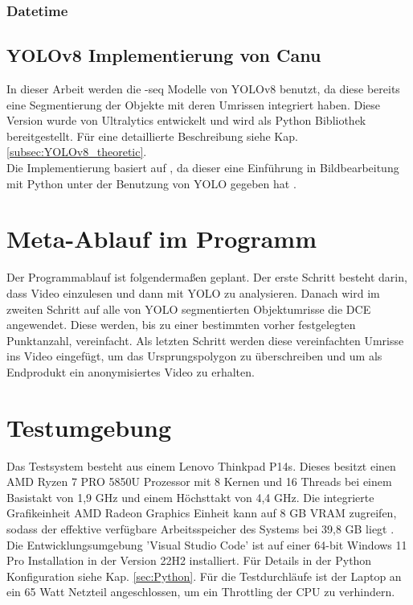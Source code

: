 		\subsubsection{Datetime}{
		}
		\subsection{YOLOv8 Implementierung von Canu}
		{ \label{YOLOv8_canu}
		In dieser Arbeit werden die \glqq-seq\grqq{} Modelle von YOLOv8 benutzt, da diese bereits eine Segmentierung der Objekte mit deren Umrissen integriert haben. Diese Version wurde von Ultralytics entwickelt und wird als Python Bibliothek bereitgestellt. Für eine detaillierte Beschreibung siehe Kap. \ref{subsec:YOLOv8_theoretic}. \\
		Die Implementierung basiert auf \citeauthor{Canu_pysource}, da dieser eine Einführung in Bildbearbeitung mit Python unter der Benutzung von YOLO gegeben hat \citep{Canu_pysource}.
		}


	
	\section{Meta-Ablauf im Programm}{
	Der Programmablauf ist folgendermaßen geplant. Der erste Schritt besteht darin, dass Video einzulesen und dann mit YOLO zu analysieren. Danach wird im zweiten Schritt auf alle von YOLO segmentierten Objektumrisse die DCE angewendet. Diese werden, bis zu einer bestimmten vorher festgelegten Punktanzahl, vereinfacht. Als letzten Schritt werden diese vereinfachten Umrisse ins Video eingefügt, um das Ursprungspolygon zu überschreiben und um als Endprodukt ein anonymisiertes Video zu erhalten.

	\section{Testumgebung}{ \label{sec:testumgebung}
	Das Testsystem besteht aus einem Lenovo Thinkpad P14s. Dieses besitzt einen AMD Ryzen 7 PRO 5850U Prozessor mit 8 Kernen und 16 Threads bei einem Basistakt von 1,9 GHz und einem Höchsttakt von 4,4 GHz. Die integrierte Grafikeinheit AMD Radeon Graphics Einheit kann auf 8 GB VRAM zugreifen, sodass der effektive verfügbare Arbeitsspeicher des Systems bei 39,8 GB liegt \citep{PSREF21}. Die Entwicklungsumgebung 'Visual Studio Code' ist auf einer 64-bit Windows 11 Pro Installation in der Version 22H2 installiert. Für Details in der Python Konfiguration siehe Kap. \ref{sec:Python}. Für die Testdurchläufe ist der Laptop an ein 65 Watt Netzteil angeschlossen, um ein Throttling der CPU zu verhindern.
}

	}





